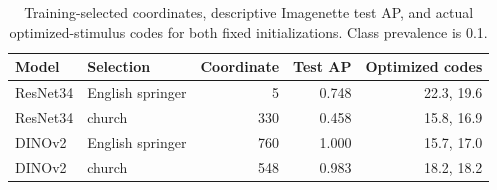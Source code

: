 \begin{table}[tbp]
    \centering
    \begin{tabular}{llrrr}
        \toprule
        Model    & Selection        & Coordinate & Test AP & Optimized codes \\
        \midrule
        ResNet34 & English springer & 5          & 0.748   & 22.3, 19.6      \\
        ResNet34 & church           & 330        & 0.458   & 15.8, 16.9      \\
        DINOv2   & English springer & 760        & 1.000   & 15.7, 17.0      \\
        DINOv2   & church           & 548        & 0.983   & 18.2, 18.2      \\
        \bottomrule
    \end{tabular}
    \caption{Training-selected coordinates, descriptive Imagenette test AP, and
        actual optimized-stimulus codes for both fixed initializations. Class
        prevalence is 0.1.}
    \label{tab:imagenette-features}
\end{table}

